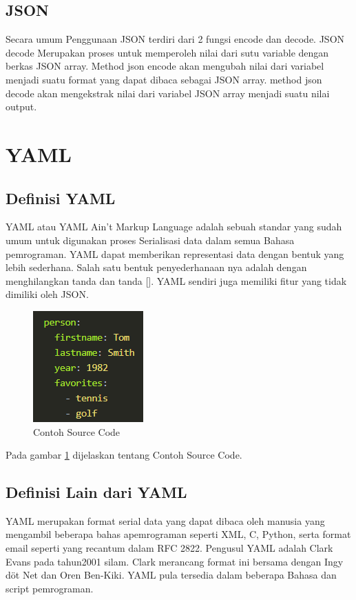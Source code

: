 \documentclass[a4paper]{article}
\begin{document}
\subsection{JSON}
Secara umum Penggunaan JSON terdiri dari 2 fungsi encode dan decode.  JSON decode Merupakan proses untuk  memperoleh nilai dari sutu variable dengan berkas JSON array. Method json encode akan mengubah nilai dari variabel  menjadi suatu format yang dapat dibaca sebagai JSON array. method json decode  akan mengekstrak nilai dari variabel JSON array  menjadi suatu nilai output.
\section{YAML}
\subsection{Definisi YAML}
YAML atau YAML Ain't Markup Language adalah sebuah standar yang sudah umum untuk digunakan proses Serialisasi data dalam semua Bahasa pemrograman. YAML dapat memberikan representasi data dengan bentuk yang lebih sederhana. Salah satu bentuk penyederhanaan nya adalah dengan menghilangkan tanda {} dan tanda []. YAML sendiri juga memiliki fitur yang tidak dimiliki oleh JSON.
\begin{figure}[ht]
\centerline{\includegraphics[scale=1]{../figures/5SC.png} }

\caption{Contoh Source Code} 
\label{Sc}
\end{figure}

Pada gambar \ref{Sc} dijelaskan tentang Contoh Source Code.

\subsection{Definisi Lain dari YAML}
YAML merupakan format serial data yang dapat dibaca oleh manusia yang mengambil beberapa bahas apemrograman seperti XML, C, Python, serta format email seperti yang recantum dalam RFC 2822. Pengusul YAML adalah Clark Evans pada tahun2001 silam. Clark merancang format ini bersama dengan Ingy döt Net dan Oren Ben-Kiki. YAML pula tersedia dalam beberapa Bahasa dan script pemrograman.
\end{document}
